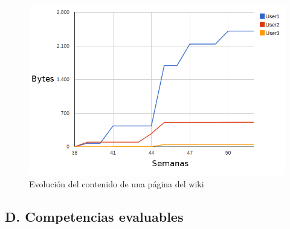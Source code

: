\begin{figure}[h]
  \begin{center}
    \includegraphics[scale=0.5]{santa_evolution.png}
  \end{center}
  \caption{Evolución del contenido de una página del wiki}
  \label{fig:SantaEvolucion}
\end{figure}

	\subsection*{D. Competencias evaluables}

